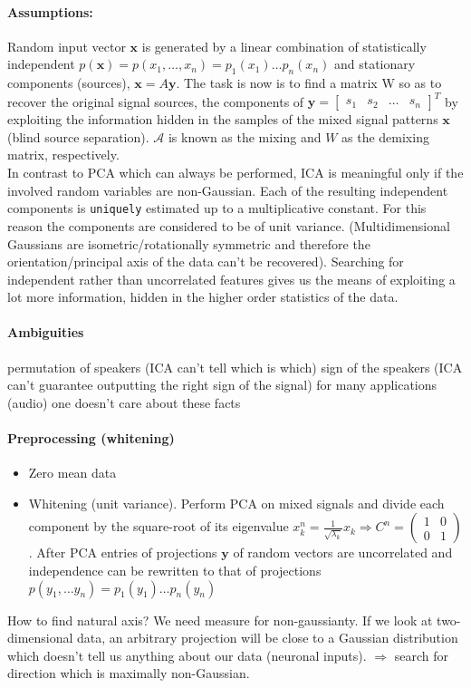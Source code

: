 \documentclass[11pt]{article}
\begin{document}
\paragraph{Assumptions:} Random input vector $\mathbf{x}$ is generated by a linear combination of statistically independent $p(\mathbf{x})=p(x_1,\dots,x_n)=p_1(x_1)\dots p_n(x_n)$ and stationary components (sources), $\mathbf{x}=A\mathbf{y}$. The task is now is to find a matrix W so as to recover the original signal sources, the components of $\mathbf{y}=\begin{bmatrix}s_1 & s_2 & \dots & s_n\end{bmatrix}^T$ by exploiting the information hidden in the samples of the mixed signal patterns $\mathbf{x}$ (blind source separation). $\mathcal{A}$ is known as the mixing and $W$ as the demixing matrix, respectively.\\
In contrast to PCA which can always be performed, ICA is meaningful only if the involved random variables are non-Gaussian. Each of the resulting independent components is \texttt{uniquely} estimated up to a multiplicative constant. For this reason the components are considered to be of unit variance. (Multidimensional Gaussians are isometric/rotationally symmetric and therefore the orientation/principal axis of the data can't be recovered). %
Searching for independent rather than uncorrelated features gives us the means of exploiting a lot more information, hidden in the higher order statistics of the data.

\paragraph{Ambiguities}
permutation of speakers (ICA can't tell which is which)
sign of the speakers (ICA can't guarantee outputting the right sign of the signal)
for many applications (audio) one doesn't care about these facts

\paragraph{Preprocessing (whitening)} \begin{itemize}
\item Zero mean data
\item Whitening (unit variance). Perform PCA on mixed signals and divide each component by the square-root of its eigenvalue $x_k^n=\frac{1}{\sqrt{\lambda_k}}x_k \Rightarrow C^n=\begin{pmatrix}1 & 0 \\ 0 & 1\end{pmatrix}$. After PCA entries of projections $\mathbf{y}$ of random vectors are uncorrelated and independence can be rewritten to that of projections $p(y_1,\dots y_n)=p_1(y_1)\dots p_n(y_n)$
\end{itemize}
How to find natural axis? We need measure for non-gaussianty.
If we look at two-dimensional data, an arbitrary projection will be close to a Gaussian distribution which doesn't tell us anything about our data (neuronal inputs). $\Rightarrow$ search for direction which is maximally non-Gaussian.\\
\end{document}
